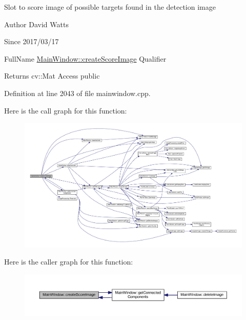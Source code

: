 Slot to score image of possible targets found in the detection image

\begin{DoxyAuthor}{Author}
David Watts 
\end{DoxyAuthor}
\begin{DoxySince}{Since}
2017/03/17
\end{DoxySince}
Full\+Name \hyperlink{class_main_window_a8d87cd33d22ce614c9d7945264588e5f}{Main\+Window\+::create\+Score\+Image} Qualifier \begin{DoxyReturn}{Returns}
cv\+::\+Mat Access public 
\end{DoxyReturn}


Definition at line 2043 of file mainwindow.\+cpp.

Here is the call graph for this function\+:
\nopagebreak
\begin{figure}[H]
\begin{center}
\leavevmode
\includegraphics[width=350pt]{class_main_window_a8d87cd33d22ce614c9d7945264588e5f_cgraph}
\end{center}
\end{figure}
Here is the caller graph for this function\+:
\nopagebreak
\begin{figure}[H]
\begin{center}
\leavevmode
\includegraphics[width=350pt]{class_main_window_a8d87cd33d22ce614c9d7945264588e5f_icgraph}
\end{center}
\end{figure}
\mbox{\label{class_main_window_ad0219fc878a0bc02403d00a16b7fc7ec}} 
